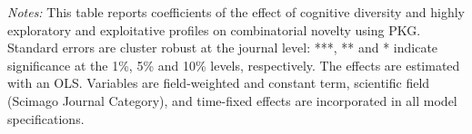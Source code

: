 \begin{table}[h!]
{\begin{threeparttable}
\begin{tabular}{@{\extracolsep{15pt}}lD{.}{.}{-3} D{.}{.}{-3} D{.}{.}{-3} D{.}{.}{-3} }
\end{tabular} 

\begin{tablenotes}
 \footnotesize
 \justifying \item {\it Notes:}
 This table reports coefficients of the effect of cognitive diversity and highly exploratory and exploitative profiles on combinatorial novelty using PKG. Standard errors are cluster robust at the journal level: ***, ** and * indicate significance at the 1\%, 5\% and 10\% levels, respectively. The effects are estimated with an OLS. Variables are field-weighted and constant term, scientific field (Scimago Journal Category), and time-fixed effects are incorporated in all model specifications.
 \end{tablenotes}
 \end{threeparttable}
 }
\end{table} 